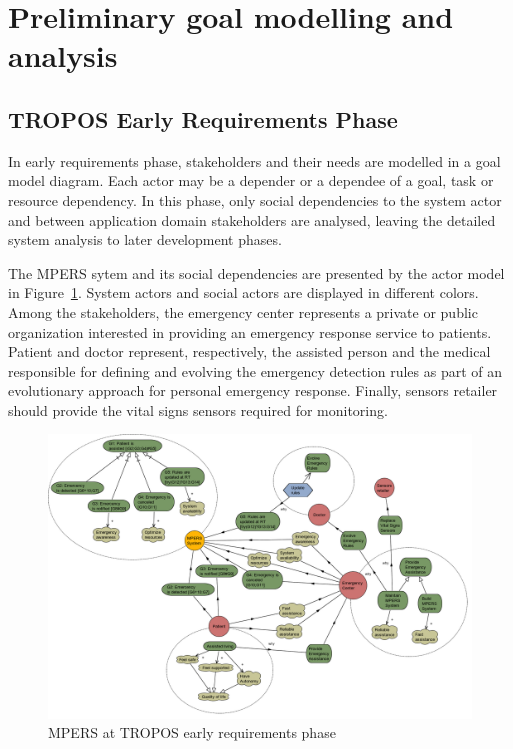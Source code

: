 \section{Preliminary goal modelling and analysis}

\subsection{TROPOS Early Requirements Phase}

In early requirements phase, stakeholders and their needs are modelled in a goal model diagram. Each actor may be a depender or a dependee of a goal, task or resource dependency. In this phase, only social dependencies to the system actor and between application domain stakeholders are analysed, leaving the detailed system analysis to later development phases.

The MPERS sytem and its social dependencies are presented by the actor model in Figure~\ref{fig:MPERS_ER}. System actors and social actors are displayed in different colors. Among the stakeholders, the emergency center represents a private or public organization interested in providing an emergency response service to patients. Patient and doctor represent, respectively, the assisted person and the medical responsible for defining and evolving the emergency detection rules as part of an evolutionary approach for personal emergency response. Finally, sensors retailer should provide the vital signs sensors required for monitoring.

\begin{figure}[ht]
\centering
\includegraphics[width=1\textwidth]{imgs/MPERS_ER.png}
\caption{MPERS at TROPOS early requirements phase}
\label{fig:MPERS_ER}
\end{figure}

